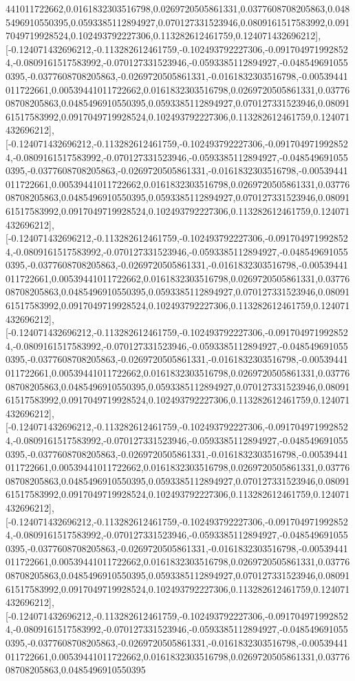 \documentclass{article}
\begin{document}
441011722662,0.0161832303516798,0.0269720505861331,0.0377608708205863,0.0485496910550395,0.0593385112894927,0.070127331523946,0.0809161517583992,0.0917049719928524,0.102493792227306,0.113282612461759,0.124071432696212],[-0.124071432696212,-0.113282612461759,-0.102493792227306,-0.0917049719928524,-0.0809161517583992,-0.070127331523946,-0.0593385112894927,-0.0485496910550395,-0.0377608708205863,-0.0269720505861331,-0.0161832303516798,-0.00539441011722661,0.00539441011722662,0.0161832303516798,0.0269720505861331,0.0377608708205863,0.0485496910550395,0.0593385112894927,0.070127331523946,0.0809161517583992,0.0917049719928524,0.102493792227306,0.113282612461759,0.124071432696212],[-0.124071432696212,-0.113282612461759,-0.102493792227306,-0.0917049719928524,-0.0809161517583992,-0.070127331523946,-0.0593385112894927,-0.0485496910550395,-0.0377608708205863,-0.0269720505861331,-0.0161832303516798,-0.00539441011722661,0.00539441011722662,0.0161832303516798,0.0269720505861331,0.0377608708205863,0.0485496910550395,0.0593385112894927,0.070127331523946,0.0809161517583992,0.0917049719928524,0.102493792227306,0.113282612461759,0.124071432696212],[-0.124071432696212,-0.113282612461759,-0.102493792227306,-0.0917049719928524,-0.0809161517583992,-0.070127331523946,-0.0593385112894927,-0.0485496910550395,-0.0377608708205863,-0.0269720505861331,-0.0161832303516798,-0.00539441011722661,0.00539441011722662,0.0161832303516798,0.0269720505861331,0.0377608708205863,0.0485496910550395,0.0593385112894927,0.070127331523946,0.0809161517583992,0.0917049719928524,0.102493792227306,0.113282612461759,0.124071432696212],[-0.124071432696212,-0.113282612461759,-0.102493792227306,-0.0917049719928524,-0.0809161517583992,-0.070127331523946,-0.0593385112894927,-0.0485496910550395,-0.0377608708205863,-0.0269720505861331,-0.0161832303516798,-0.00539441011722661,0.00539441011722662,0.0161832303516798,0.0269720505861331,0.0377608708205863,0.0485496910550395,0.0593385112894927,0.070127331523946,0.0809161517583992,0.0917049719928524,0.102493792227306,0.113282612461759,0.124071432696212],[-0.124071432696212,-0.113282612461759,-0.102493792227306,-0.0917049719928524,-0.0809161517583992,-0.070127331523946,-0.0593385112894927,-0.0485496910550395,-0.0377608708205863,-0.0269720505861331,-0.0161832303516798,-0.00539441011722661,0.00539441011722662,0.0161832303516798,0.0269720505861331,0.0377608708205863,0.0485496910550395,0.0593385112894927,0.070127331523946,0.0809161517583992,0.0917049719928524,0.102493792227306,0.113282612461759,0.124071432696212],[-0.124071432696212,-0.113282612461759,-0.102493792227306,-0.0917049719928524,-0.0809161517583992,-0.070127331523946,-0.0593385112894927,-0.0485496910550395,-0.0377608708205863,-0.0269720505861331,-0.0161832303516798,-0.00539441011722661,0.00539441011722662,0.0161832303516798,0.0269720505861331,0.0377608708205863,0.0485496910550395,0.0593385112894927,0.070127331523946,0.0809161517583992,0.0917049719928524,0.102493792227306,0.113282612461759,0.124071432696212],[-0.124071432696212,-0.113282612461759,-0.102493792227306,-0.0917049719928524,-0.0809161517583992,-0.070127331523946,-0.0593385112894927,-0.0485496910550395,-0.0377608708205863,-0.0269720505861331,-0.0161832303516798,-0.00539441011722661,0.00539441011722662,0.0161832303516798,0.0269720505861331,0.0377608708205863,0.0485496910550395
\end{document}
